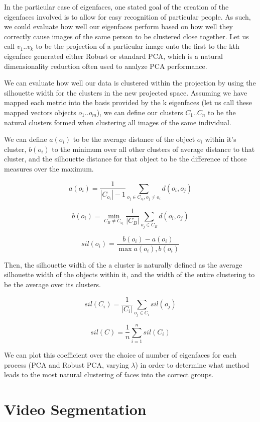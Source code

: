 \documentclass[11pt]{scrartcl} %
\theoremstyle{plain}
\begin{document}
In the particular case of eigenfaces, one stated goal of the creation of the eigenfaces involved is to allow for easy recognition of particular people. As such, we could evaluate how well our eigenfaces perform based on how well they correctly cause images of the same person to be clustered close together. Let us call $v_1 .. v_k$ to be the projection of a particular image onto the first to the kth eigenface generated either Robust or standard PCA, which is a natural dimensionality reduction often used to analyze PCA performance.

We can evaluate how well our data is clustered within the projection by using the silhouette width\cite{silhouette} for the clusters in the new projected space. Assuming we have mapped each metric into the basis provided by the k eigenfaces (let us call these mapped vectors objects $o_1 .. o_m$), we can define our clusters $C_1 .. C_n$ to be the natural clusters formed when clustering all images of the same individual.

We can define $a(o_i)$ to be the average distance of the object $o_i$ within it's cluster, $b(o_i)$ to the minimum over all other clusters of average distance to that cluster, and the silhouette distance for that object to be the difference of those measures over the maximum.

\[
a(o_i) = \frac{1}{|C_{o_i}| - 1} \sum_{o_j \in C_{o_i}, o_j \ne o_i} d(o_i, o_j)
\]

\[
b(o_i) = \min_{C_B \ne C_{o_i}} \frac{1}{|C_B|} \sum_{o_j \in C_B} d(o_i, o_j)
\]

\[
sil(o_i) = \frac{b(o_i) - a(o_i)}{\max{a(o_i), b(o_i)}}
\]

Then, the silhouette width of the a cluster is naturally defined as the average silhouette width of the objects within it, and the width of the entire clustering to be the average over its clusters.
 
\[
sil(C_i) = \frac{1}{|C_i|}\sum_{o_j \in C_i} sil(o_j)
\]

\[
sil(C) = \frac{1}{n}\sum_{i = 1}^{n} sil(C_i)
\]

We can plot this coefficient over the choice of number of eigenfaces for each process (PCA and Robust PCA, varying $\lambda$) in order to determine what method leads to the most natural clustering of faces into the correct groups.

\section{Video Segmentation}
\end{document}
